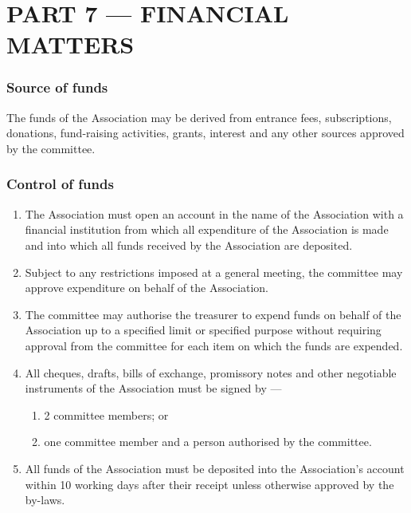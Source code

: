 \hypertarget{part-7-financial-matters}{%
\part{PART 7 --- FINANCIAL MATTERS}\label{part-7-financial-matters}}

\hypertarget{source-of-funds}{%
\section{Source of funds}\label{source-of-funds}}

The funds of the Association may be derived from entrance fees, subscriptions, donations, fund-raising activities, grants, interest and any other sources approved by the committee.

\hypertarget{control-of-funds}{%
\section{Control of funds}\label{control-of-funds}}

\begin{enumerate}

\item The Association must open an account in the name of the Association with a financial institution from which all expenditure of the Association is made and into which all funds received by the Association are deposited.
\item Subject to any restrictions imposed at a general meeting, the committee may approve expenditure on behalf of the Association.
\item The committee may authorise the treasurer to expend funds on behalf of the Association up to a specified limit or specified purpose without requiring approval from the committee for each item on which the funds are expended.
\item All cheques, drafts, bills of exchange, promissory notes and other negotiable instruments of the Association must be signed by ---

  \begin{enumerate}
  
  \item 2 committee members; or
  \item one committee member and a person authorised by the committee.
  \end{enumerate}
\item All funds of the Association must be deposited into the Association's account within 10 working days after their receipt unless otherwise approved by the by-laws.
\end{enumerate}

